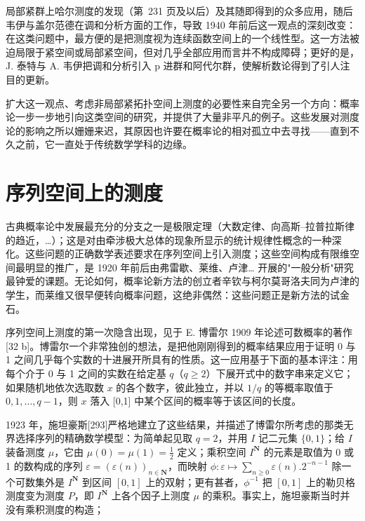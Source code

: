 局部紧群上哈尔测度的发现（第~231 页及以后）及其随即得到的众多应用，随后韦伊与盖尔范德在调和分析方面的工作，导致 1940 年前后这一观点的深刻改变：在这类问题中，最方便的是把测度视为连续函数空间上的一个线性型。这一方法被迫局限于紧空间或局部紧空间，但对几乎全部应用而言并不构成障碍；更好的是，J. 泰特与 A. 韦伊把调和分析引入 p 进群和阿代尔群，使解析数论得到了引人注目的更新。

扩大这一观点、考虑非局部紧拓扑空间上测度的必要性来自完全另一个方向：概率论一步一步地引向这类空间的研究，并提供了大量非平凡的例子。这些发展对测度论的影响之所以姗姗来迟，其原因也许要在概率论的相对孤立中去寻找——直到不久之前，它一直处于传统数学学科的边缘。

\section*{序列空间上的测度}
{}

古典概率论中发展最充分的分支之一是极限定理（大数定律、向高斯–拉普拉斯律的趋近，\ldots）；这是对由牵涉极大总体的现象所显示的统计规律性概念的一种深化。这些问题的正确数学表述要求在序列空间上引入测度；这些空间构成有限维空间最明显的推广，是 1920 年前后由弗雷歇、莱维、卢津\ldots{} 开展的"一般分析"研究最钟爱的课题。无论如何，概率论新方法的创立者辛钦与柯尔莫哥洛夫同为卢津的学生，而莱维又很早便转向概率问题，这绝非偶然：这些问题正是新方法的试金石。

序列空间上测度的第一次隐含出现，见于 E. 博雷尔 1909 年论述可数概率的著作{[}32 b{]}。博雷尔一个非常独创的想法，是把他刚刚得到的概率结果应用于证明 0 与 1 之间几乎每个实数的十进展开所具有的性质。这一应用基于下面的基本评注：用每个介于 0 与 1 之间的实数在给定基 \(q\)（\(q \geq 2\)）下展开式中的数字串来定义它；如果随机地依次选取数 \(x\) 的各个数字，彼此独立，并以 \(1/q\) 的等概率取值于 \(0,1,\ldots,q-1\)，则 \(x\) 落入 [0,1] 中某个区间的概率等于该区间的长度。

1923 年，施坦豪斯{[}293{]}严格地建立了这些结果，并描述了博雷尔所考虑的那类无界选择序列的精确数学模型：为简单起见取 \(q = 2\)，并用 \(I\) 记二元集 \(\{0,1\}\)；给 \(I\) 装备测度 \(\mu\)，它由 \(\mu(0) = \mu(1) = \frac{1}{2}\) 定义；乘积空间 \(I^{\mathbf{N}}\) 的元素是取值为 0 或 1 的数构成的序列 \(\varepsilon = (\varepsilon(n))_{n \in \mathbf{N}}\)，而映射 \(\phi : \varepsilon \mapsto \sum_{n \geq 0} \varepsilon(n). 2^{-n-1}\) 除一个可数集外是 \(I^{\mathbf{N}}\) 到区间 \([0,1]\) 上的双射；更有甚者，\(\phi^{-1}\) 把 \([0,1]\) 上的勒贝格测度变为测度 \(P\)，即 \(I^{\mathbf{N}}\) 上各个因子上测度 \(\mu\) 的乘积。事实上，施坦豪斯当时并没有乘积测度的构造；

